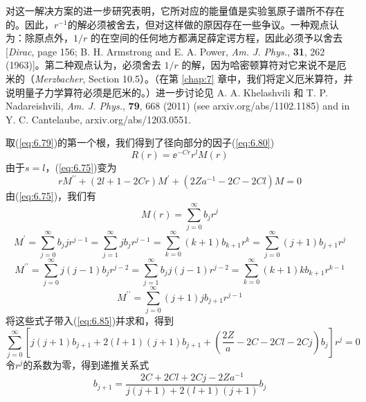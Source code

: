     对这一解决方案的进一步研究表明，它所对应的能量值是实验氢原子谱所不存在的。因此，$r^{-1}$的解必须被舍去，但对这样做的原因存在一些争议。一种观点认为：除原点外，$1/r$ 的在空间的任何地方都满足薛定谔方程，因此必须予以舍去[\textit{Dirac}, page 156; B. H. Armstrong and E. A. Power, \textit{Am. J. Phys.}, \textbf{31}, 262 (1963)]。第二种观点认为，必须舍去 $1/r$ 的解，因为哈密顿算符对它来说不是厄米的（\textit{Merzbacher}, Section 10.5）。（在第 \ref{chap:7} 章中，我们将定义厄米算符，并说明量子力学算符必须是厄米的。）进一步讨论见 A. A. Khelashvili 和 T. P. Nadareishvili, \textit{Am. J. Phys.}, \textbf{79}, 668 (2011) (see arxiv.org/abs/1102.1185) and in Y. C. Cantelaube, arxiv.org/abs/1203.0551.

    取(\ref{eq:6.79})的第一个根，我们得到了径向部分的因子(\ref{eq:6.80})
    \begin{equation}
        R\left(r\right) = \ee ^{-Cr}r^lM\left(r\right)
        \label{eq:6.84}
    \end{equation}
    由于$s=l$，(\ref{eq:6.75})变为
    \begin{equation}
        rM^{\prime\prime} + \left(2l+1-2Cr\right)M^{\prime} + \left(2Za^{-1}-2C-2Cl\right)M = 0
        \label{eq:6.85}
    \end{equation}
    由(\ref{eq:6.75})，我们有
    \begin{equation}
        M\left(r\right) = \sum_{j=0}^{\infty}b_jr^j
        \label{eq:6.86}
    \end{equation}
    \begin{equation*}
        M^{\prime} = \sum_{j=0}^{\infty}b_jjr^{j-1} = \sum_{j=1}^{\infty}jb_jr^{j-1} = \sum_{k=0}^{\infty}\left(k+1\right)b_{k+1}r^k = \sum_{j=0}^{\infty}\left(j+1\right)b_{j+1}r^j
    \end{equation*}
    \begin{equation*}
        M^{\prime\prime} = \sum_{j=0}^{\infty}j\left(j-1\right)b_jr^{j-2} = \sum_{j=1}^{\infty}b_jj\left(j-1\right)r^{j-2} = \sum_{k=0}^{\infty}\left(k+1\right)kb_{k+1}r^{k-1}
    \end{equation*}
    \begin{equation}
        M^{\prime\prime} = \sum_{j=0}^{\infty}\left(j+1\right)jb_{j+1}r^{j-1}
        \label{eq:6.87}
    \end{equation}
    将这些式子带入(\ref{eq:6.85})并求和，得到
    \begin{equation*}
        \sum_{j=0}^{\infty}\left[j\left(j+1\right)b_{j+1} + 2\left(l+1\right)\left(j+1\right)b_{j+1} + \left(\frac{2Z}{a} - 2C - 2Cl - 2Cj\right)b_j\right]r^j = 0
    \end{equation*}
    令$r^j$的系数为零，得到递推关系式
    \begin{equation}
        b_{j+1} = \frac{2C + 2Cl + 2Cj - 2Za^{-1}}{j\left(j+1\right) + 2\left(l+1\right)\left(j+1\right)}b_j
        \label{eq:6.88}
    \end{equation}

